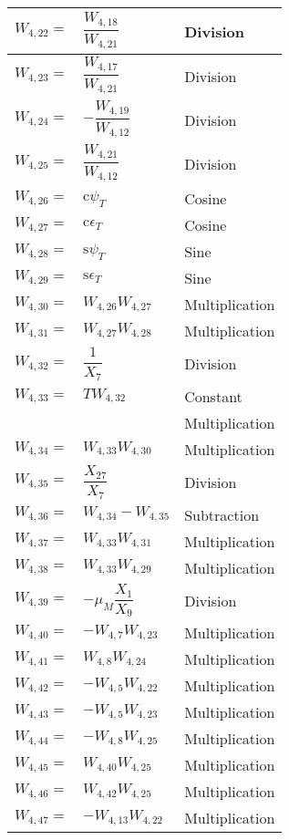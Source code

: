 {\begin{longtable}{|p{1.5cm}|l|p{2cm}|}
$W_{4,22}=$ & $ \dfrac{W_{4,18}}{W_{4,21}} $ & Division \\ \hline
$W_{4,23}=$ & $ \dfrac{W_{4,17}}{W_{4,21}} $ & Division \\ \hline
$W_{4,24}=$ & $ -\dfrac{W_{4,19}}{W_{4,12}} $ & Division \\ \hline
$W_{4,25}=$ & $ \dfrac{W_{4,21}}{W_{4,12}} $ & Division \\ \hline
$W_{4,26}=$ & $ \text{c}\psi_{T} $ & Cosine \\ \hline
$W_{4,27}=$ & $ \text{c}\epsilon_{T} $ & Cosine \\ \hline
$W_{4,28}=$ & $ \text{s}\psi_{T} $ & Sine \\ \hline
$W_{4,29}=$ & $ \text{s}\epsilon_{T} $ & Sine \\ \hline
$W_{4,30}=$ & $ W_{4,26}W_{4,27} $ & Multiplication \\ \hline
$W_{4,31}=$ & $ W_{4,27}W_{4,28} $ & Multiplication \\ \hline
$W_{4,32}=$ & $ \dfrac{1}{X_{7}} $ & Division \\ \hline
$W_{4,33}=$ & $ T W_{4,32} $ & Constant  \\ 
& & Multiplication \\ \hline
$W_{4,34}=$ & $ W_{4,33}W_{4,30} $ & Multiplication \\ \hline
$W_{4,35}=$ & $ \dfrac{X_{27}}{X_{7}} $ & Division \\ \hline
$W_{4,36}=$ & $ W_{4,34}-W_{4,35} $ & Subtraction \\ \hline
$W_{4,37}=$ & $ W_{4,33}W_{4,31} $ & Multiplication \\ \hline
$W_{4,38}=$ & $ W_{4,33}W_{4,29} $ & Multiplication \\ \hline
$W_{4,39}=$ & $ -\mu_{M}\dfrac{X_{1}}{X_{9}} $ & Division \\ \hline
$W_{4,40}=$ & $ -W_{4,7}W_{4,23} $ & Multiplication \\ \hline
$W_{4,41}=$ & $ W_{4,8}W_{4,24} $ & Multiplication \\ \hline
$W_{4,42}=$ & $ -W_{4,5}W_{4,22} $ & Multiplication \\ \hline
$W_{4,43}=$ & $ -W_{4,5}W_{4,23} $ & Multiplication \\ \hline
$W_{4,44}=$ & $ -W_{4,8}W_{4,25} $ & Multiplication \\ \hline
$W_{4,45}=$ & $ W_{4,40}W_{4,25} $ & Multiplication \\ \hline
$W_{4,46}=$ & $ W_{4,42}W_{4,25} $ & Multiplication \\ \hline
$W_{4,47}=$ & $ -W_{4,13}W_{4,22} $ & Multiplication \\ \hline

\end{longtable}}
